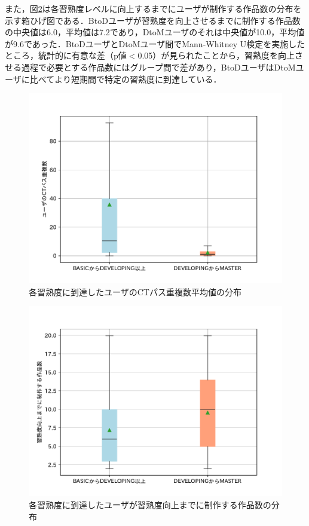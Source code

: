 \documentclass[11pt,dvipdfmx]{jreport}
\begin{document}
また，図\ref{fig:path-length}は各習熟度レベルに向上するまでにユーザが制作する作品数の分布を示す箱ひげ図である．BtoDユーザが習熟度を向上させるまでに制作する作品数の中央値は6.0，平均値は7.2であり，DtoMユーザのそれは中央値が10.0，平均値が9.6であった．BtoDユーザとDtoMユーザ間でMann-Whitney U検定を実施したところ，統計的に有意な差（p値$<$0.05）が見られたことから，習熟度を向上させる過程で必要とする作品数にはグループ間で差があり，BtoDユーザはDtoMユーザに比べてより短期間で特定の習熟度に到達している．

\begin{figure}[t]
	\centering
	\includegraphics[width=0.8\linewidth]{Okamoto_fig/dupli-all.pdf}
        \vspace{-5mm}
	\caption{各習熟度に到達したユーザのCTパス重複数平均値の分布}
	\label{fig:dupli-mean}
\end{figure}

\begin{figure}[t]
	\centering
	\includegraphics[width=0.8\linewidth]{Okamoto_fig/path-length.pdf}
        \vspace{-5mm}
	\caption{各習熟度に到達したユーザが習熟度向上までに制作する作品数の分布}
	\label{fig:path-length}
\end{figure}
\end{document}
